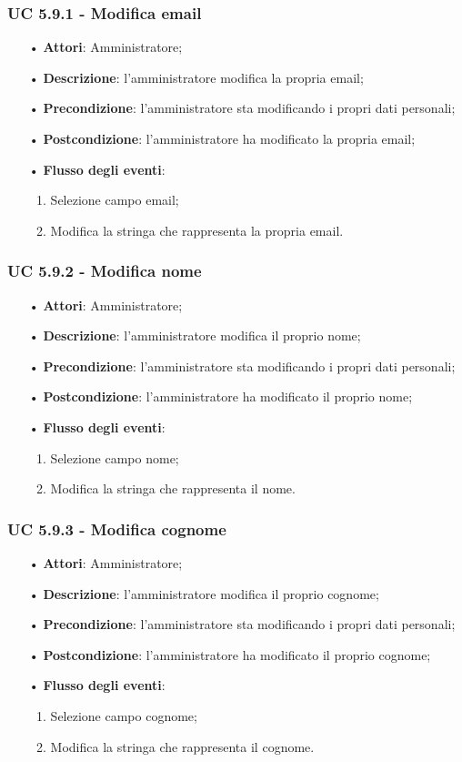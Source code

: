 \subsubsection{UC 5.9.1 - Modifica email}
\begin{itemize}
	\item[•]\textbf{Attori}: Amministratore;
	\item[•]\textbf{Descrizione}: l'amministratore modifica la propria email;
	\item[•]\textbf{Precondizione}: l'amministratore sta modificando i propri dati personali;
	\item[•]\textbf{Postcondizione}: l'amministratore ha modificato la propria email; 
	\item[•]\textbf{Flusso degli eventi}: 
	\begin{enumerate}
		\item Selezione campo email;
		\item Modifica la stringa che rappresenta la propria email.
	\end{enumerate}
\end{itemize}
\subsubsection{UC 5.9.2 - Modifica nome}
\begin{itemize}
	\item[•]\textbf{Attori}: Amministratore;
	\item[•]\textbf{Descrizione}: l'amministratore modifica il proprio nome;
	\item[•]\textbf{Precondizione}: l'amministratore sta modificando i propri dati personali;
	\item[•]\textbf{Postcondizione}: l'amministratore ha modificato il proprio nome; 
	\item[•]\textbf{Flusso degli eventi}: 
	\begin{enumerate}
		\item Selezione campo nome;
		\item Modifica la stringa che rappresenta il nome.
	\end{enumerate}
\end{itemize}
\subsubsection{UC 5.9.3 - Modifica cognome}
\begin{itemize}
	\item[•]\textbf{Attori}: Amministratore;
	\item[•]\textbf{Descrizione}: l'amministratore modifica il proprio cognome;
	\item[•]\textbf{Precondizione}: l'amministratore sta modificando i propri dati personali;
	\item[•]\textbf{Postcondizione}: l'amministratore ha modificato il proprio cognome; 
	\item[•]\textbf{Flusso degli eventi}: 
	\begin{enumerate}
		\item Selezione campo cognome;
		\item Modifica la stringa che rappresenta il cognome.
	\end{enumerate}
\end{itemize}
